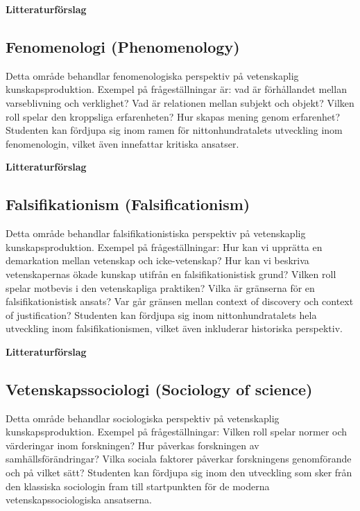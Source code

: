 \documentclass[12pt,a4paper]{article}
\begin{document}
\noindent \textbf{Litteraturförslag}


 
 
  

\subsection{Fenomenologi (Phenomenology)} Detta område behandlar fenomenologiska perspektiv på vetenskaplig kunskapsproduktion. Exempel på frågeställningar är: vad är förhållandet mellan varseblivning och verklighet? Vad är relationen mellan subjekt och objekt? Vilken roll spelar den kroppsliga erfarenheten? Hur skapas mening genom erfarenhet? Studenten kan fördjupa sig inom ramen för nittonhundratalets utveckling inom fenomenologin, vilket även innefattar kritiska ansatser. 


\noindent \textbf{Litteraturförslag}

 \fullcite{}
 
 \fullcite{}
  
 \fullcite{}

\subsection{Falsifikationism (Falsificationism)}
Detta område behandlar falsifikationistiska perspektiv på vetenskaplig kunskapsproduktion. Exempel på frågeställningar: Hur kan vi upprätta en demarkation mellan vetenskap och icke-vetenskap? Hur kan vi beskriva vetenskapernas ökade kunskap utifrån en falsifikationistisk grund? Vilken roll spelar motbevis i den vetenskapliga praktiken? Vilka är gränserna för en falsifikationistisk ansats? Var går gränsen mellan context of discovery och context of justification? Studenten kan fördjupa sig inom nittonhundratalets hela utveckling inom falsifikationismen, vilket även inkluderar historiska perspektiv. 


\noindent \textbf{Litteraturförslag}

 
 \fullcite{}
  
 \fullcite{}

\subsection{Vetenskapssociologi (Sociology of science)}
Detta område behandlar sociologiska perspektiv på vetenskaplig kunskapsproduktion. Exempel på frågeställningar: Vilken roll spelar normer och värderingar inom forskningen? Hur påverkas forskningen av samhällsförändringar? Vilka sociala faktorer påverkar forskningens genomförande och på vilket sätt? Studenten kan fördjupa sig inom den utveckling som sker från den klassiska sociologin fram till startpunkten för de moderna vetenskapssociologiska ansatserna. 
\end{document}
